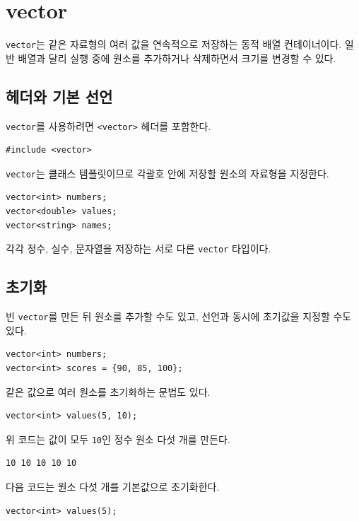 \documentclass[11pt,a4paper]{article}
\begin{document}
\section{vector}
\texttt{vector}는 같은 자료형의 여러 값을 연속적으로 저장하는 동적 배열 컨테이너이다. 일반 배열과 달리 실행 중에 원소를 추가하거나 삭제하면서 크기를 변경할 수 있다.

\subsection{헤더와 기본 선언}
\texttt{vector}를 사용하려면 \texttt{<vector>} 헤더를 포함한다.

\begin{lstlisting}
#include <vector>
\end{lstlisting}

\texttt{vector}는 클래스 템플릿이므로 각괄호 안에 저장할 원소의 자료형을 지정한다.

\begin{lstlisting}
vector<int> numbers;
vector<double> values;
vector<string> names;
\end{lstlisting}

각각 정수, 실수, 문자열을 저장하는 서로 다른 \texttt{vector} 타입이다.

\subsection{초기화}
빈 \texttt{vector}를 만든 뒤 원소를 추가할 수도 있고, 선언과 동시에 초기값을 지정할 수도 있다.

\begin{lstlisting}
vector<int> numbers;
vector<int> scores = {90, 85, 100};
\end{lstlisting}

같은 값으로 여러 원소를 초기화하는 문법도 있다.

\begin{lstlisting}
vector<int> values(5, 10);
\end{lstlisting}

위 코드는 값이 모두 \texttt{10}인 정수 원소 다섯 개를 만든다.

\begin{verbatim}
10 10 10 10 10
\end{verbatim}

다음 코드는 원소 다섯 개를 기본값으로 초기화한다.

\begin{lstlisting}
vector<int> values(5);
\end{lstlisting}
\end{document}
